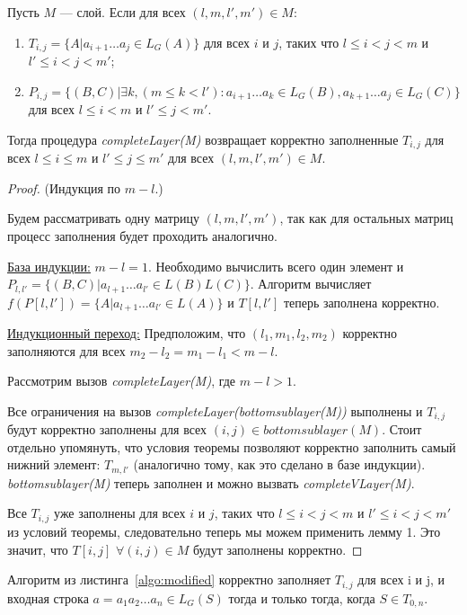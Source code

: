 \documentclass[14pt]{matmex-diploma-custom}
\begin{document}
\begin{theorem}
Пусть $M$ --- слой. Если для всех $(l, m, l', m') \in M$:
\begin{enumerate}
  \item $T_{i, j} = \{ A |  a_{i + 1} \dots a_{j} \in L_G(A)\}$ для всех $i$ и $j$, таких что $l \leq i < j < m$ и $l' \leq i < j < m'$;
  \item $P_{i, j} =  \{ (B, C) |\exists k, (m \le k < l'): a_{i + 1} \dots a_{k} \in L_G(B), a_{k + 1} \dots a_{j} \in L_G(C)\}$ для всех $l \leq i < m$ и $l' \leq j < m'$.
\end{enumerate}

Тогда процедура \textit{completeLayer(M)} возвращает корректно заполненные $T_{i, j}$ для всех $l \leq i \le m$ и $l' \leq j \le m'$ для всех $(l, m, l', m') \in M$.
\end{theorem}


\begin{proof}(Индукция по $m - l$.)

Будем рассматривать одну матрицу $(l, m, l', m')$, так как для остальных матриц процесс заполнения будет проходить аналогично.

\underline{База индукции:} $m - l = 1$. Необходимо вычислить всего один элемент и $P_{l, l'} =  \{ (B, C) |  a_{l + 1} \dots a_{l'} \in L(B)L(C)\}$. Алгоритм вычисляет $f(P[l, l']) = \{ A |  a_{l + 1} \dots a_{l'} \in L(A)\}$ и $T[l, l']$ теперь заполнена корректно.

\underline{Индукционный переход:} Предположим, что $(l_1, m_1, l_2, m_2)$ корректно заполняются для всех $m_2 - l_2 = m_1 - l_1 < m - l$.

Рассмотрим вызов \textit{completeLayer(M)}, где $m - l > 1$.

Все ограничения на вызов \textit{completeLayer(bottomsublayer(M))} выполнены и $T_{i, j}$ будут корректно заполнены для всех $(i, j) \in bottomsublayer(M)$. Стоит отдельно упомянуть, что условия теоремы позволяют корректно заполнить самый нижний элемент: $T_{m, l'}$ (аналогично тому, как это сделано в базе индукции).
\textit{bottomsublayer(M)} теперь заполнен и можно вызвать \textit{completeVLayer(M)}.

Все $T_{i,j}$ уже заполнены для всех $i$ и $j$, таких что $l \leq i < j < m$ и $l' \leq i < j < m'$ из условий теоремы, следовательно теперь мы можем применить лемму 1. Это значит, что $T[i, j]$ $\forall (i, j) \in M$ будут заполнены корректно.
\end{proof}

\begin{theorem}
Алгоритм из листинга~\ref{algo:modified} корректно заполняет $T_{i, j}$ для всех i и j, и входная строка $a = a_{1}a_{2} \dots a_{n} \in L_{G}(S)$ тогда и только тогда, когда $S \in T_{0, n}$.
\end{theorem}
\end{document}
